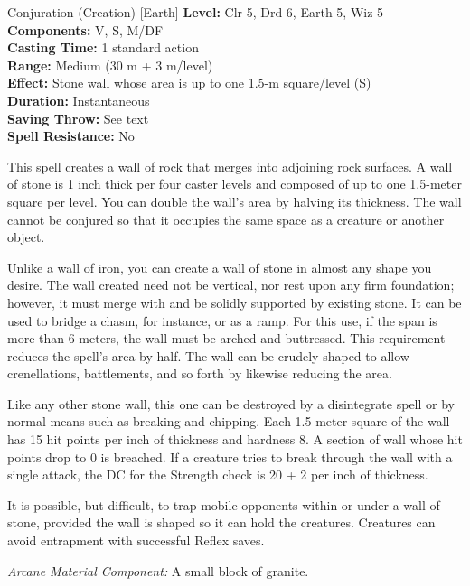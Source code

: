 {Conjuration (Creation) [Earth]}
{
	\textbf{Level:}
	Clr 5, Drd 6, Earth 5, Wiz 5\\
	\textbf{Components:}
	V, S, M/DF\\
	\textbf{Casting Time:}
	1 standard action\\
	\textbf{Range:}
	Medium (30 m + 3 m/level)\\
	\textbf{Effect:}
	Stone wall whose area is up to one 1.5-m square/level (S)\\
	\textbf{Duration:}
	Instantaneous\\
	\textbf{Saving Throw:}
	See text\\
	\textbf{Spell Resistance:}
	No\\
}
{
	This spell creates a wall of rock that merges into adjoining rock surfaces. A wall of stone is 1 inch thick per four caster levels and composed of up to one 1.5-meter square per level. You can double the wall's area by halving its thickness. The wall cannot be conjured so that it occupies the same space as a creature or another object.

	Unlike a wall of iron, you can create a wall of stone in almost any shape you desire. The wall created need not be vertical, nor rest upon any firm foundation; however, it must merge with and be solidly supported by existing stone. It can be used to bridge a chasm, for instance, or as a ramp. For this use, if the span is more than 6 meters, the wall must be arched and buttressed. This requirement reduces the spell's area by half. The wall can be crudely shaped to allow crenellations, battlements, and so forth by likewise reducing the area.

	Like any other stone wall, this one can be destroyed by a disintegrate spell or by normal means such as breaking and chipping. Each 1.5-meter square of the wall has 15 hit points per inch of thickness and hardness 8. A section of wall whose hit points drop to 0 is breached. If a creature tries to break through the wall with a single attack, the DC for the Strength check is 20 + 2 per inch of thickness.

	It is possible, but difficult, to trap mobile opponents within or under a wall of stone, provided the wall is shaped so it can hold the creatures. Creatures can avoid entrapment with successful Reflex saves.

	\textit{Arcane Material Component:}
	A small block of granite.

}
